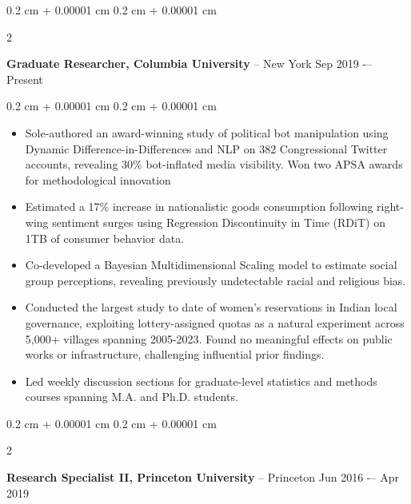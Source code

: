 \documentclass[10pt, letterpaper]{article}
\newenvironment{highlights}{
    \begin{itemize}[
        topsep=0.10 cm,
        parsep=0.10 cm,
        partopsep=0pt,
        itemsep=0pt,
        leftmargin=0.4 cm + 10pt
    ]
}{
    \end{itemize}
} %
\newenvironment{onecolentry}{
    \begin{adjustwidth}{
        0.2 cm + 0.00001 cm
    }{
        0.2 cm + 0.00001 cm
    }
}{
    \end{adjustwidth}
} %
\newenvironment{twocolentry}[2][]{
    \onecolentry
    \def\secondColumn{#2}
    \setcolumnwidth{\fill, 4.5 cm}
    \begin{paracol}{2}
}{
    \switchcolumn \raggedleft \secondColumn
    \end{paracol}
    \endonecolentry
} %
\begin{document}
        \begin{twocolentry}{Sep 2019 -– Present}
            \textbf{Graduate Researcher, Columbia University} -- New York\end{twocolentry}
            \begin{onecolentry}
             
            \begin{highlights}
             \vspace{0.05 cm}
              \item Sole-authored an award-winning study of political bot manipulation using Dynamic Difference-in-Differences and NLP on 382 Congressional Twitter accounts, revealing 30\% bot-inflated media visibility. Won two APSA awards for methodological innovation
                   
                   \item Estimated a 17\% increase in nationalistic goods consumption following right-wing sentiment surges using Regression Discontinuity in Time (RDiT) on 1TB of consumer behavior data.

                 \item Co-developed a Bayesian Multidimensional Scaling model to estimate social group perceptions, revealing previously undetectable racial and religious bias.

                  \item Conducted the largest study to date of women's reservations in Indian local governance, exploiting lottery-assigned quotas as a natural experiment across 5,000+ villages spanning 2005-2023. Found no meaningful effects on public works or infrastructure, challenging influential prior findings.

                  \item Led weekly discussion sections for graduate-level statistics and methods courses spanning M.A. and Ph.D. students.
                
            \end{highlights}
        \end{onecolentry}
  \vspace{0.10 cm}

        \begin{twocolentry}{
            Jun 2016 -– Apr 2019
        }
            \textbf{Research Specialist II, Princeton University} -- Princeton\end{twocolentry}
\end{document}
